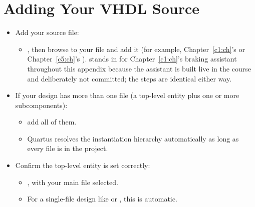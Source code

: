 \section{Adding Your VHDL Source}
\label{q:4}
\begin{itemize}
  \item Add your source file:
  \begin{itemize}
    \item {}, then browse to your  file and
      add it (for example, Chapter~\ref{c1:ch}'s  or
      Chapter~\ref{c5:ch}'s ).  stands
      in for Chapter~\ref{c1:ch}'s braking assistant throughout this appendix because the
      assistant is built live in the course and deliberately not committed; the steps are
      identical either way.
  \end{itemize}
  \item If your design has more than one file (a top-level entity plus one or more
    subcomponents):
  \begin{itemize}
    \item add all of them.
    \item Quartus resolves the instantiation hierarchy automatically as long as every file is in
      the project.
  \end{itemize}
  \item Confirm the top-level entity is set correctly:
  \begin{itemize}
    \item {}, with your main file selected.
    \item For a single-file design like  or , this is automatic.
  \end{itemize}
\end{itemize}

